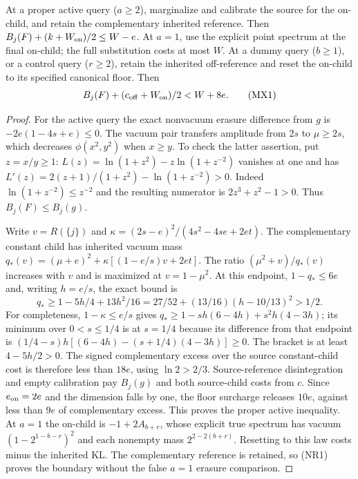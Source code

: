 \begin{lemma}
At a proper active query ($a\ge2$), marginalize and calibrate the
source for the on-child, and retain the complementary inherited
reference. Then $B_j(F)+(k+W_{\rm on})/2\le W-e$.
At $a=1$, use the explicit point spectrum at the final on-child;
the full substitution costs at most $W$.
At a dummy query ($b\ge1$), or a control query ($r\ge2$), retain
the inherited off-reference and reset the on-child to its specified
canonical floor. Then
\[
 B_j(F)+(c_{\rm off}+W_{\rm on})/2<W+8e.
 \tag{MX1}
\]
\end{lemma}
\begin{proof}
For the active query the exact nonvacuum erasure difference from
$g$ is $-2e(1-4s+e)\le0$. The vacuum pair transfers amplitude
from $2s$ to $\mu\ge2s$, which decreases
$\phi(x^2,y^2)$ when $x\ge y$. To check the latter assertion,
put $z=x/y\ge1$: $L(z)=\ln(1+z^2)-z\ln(1+z^{-2})$ vanishes
at one and has
$L'(z)=2(z+1)/(1+z^2)-\ln(1+z^{-2})>0$.
Indeed $\ln(1+z^{-2})\le z^{-2}$ and the resulting numerator
is $2z^3+z^2-1>0$. Thus $B_j(F)\le B_j(g)$.

Write $v=R(\{j\})$ and
$\kappa=(2s-e)^2/(4s^2-4se+2et)$. The complementary constant
child has inherited vacuum mass
$q_*(v)=(\mu+e)^2+\kappa[(1-e/s)v+2et]$.
The ratio $(\mu^2+v)/q_*(v)$ increases with $v$ and is maximized
at $v=1-\mu^2$. At this endpoint, $1-q_*\le6e$ and, writing
$h=e/s$, the exact bound is
\[
 q_*\ge1-5h/4+13h^2/16
       =27/52+(13/16)(h-10/13)^2>1/2.
\]
For completeness, $1-\kappa\le e/s$ gives
$q_*\ge1-sh(6-4h)+s^2h(4-3h)$; its minimum over
$0<s\le1/4$ is at $s=1/4$ because its difference from that
endpoint is $(1/4-s)h[(6-4h)-(s+1/4)(4-3h)]\ge0$.
The bracket is at least $4-5h/2>0$. The signed complementary
excess over the source constant-child cost is therefore less
than $18e$, using $\ln2>2/3$. Source-reference disintegration and
empty calibration pay $B_j(g)$ and both source-child costs from
$c$. Since $e_{\rm on}=2e$ and the dimension falls by one,
the floor surcharge releases $10e$, against less than $9e$ of
complementary excess. This proves the proper active inequality.
At $a=1$ the on-child is $-1+2A_{b+r}$, whose explicit true
spectrum has vacuum $(1-2^{1-b-r})^2$ and each nonempty mass
$2^{2-2(b+r)}$. Resetting to this law costs minus the inherited
KL. The complementary reference is retained, so (NR1) proves
the boundary without the false $a=1$ erasure comparison.


\end{proof}
